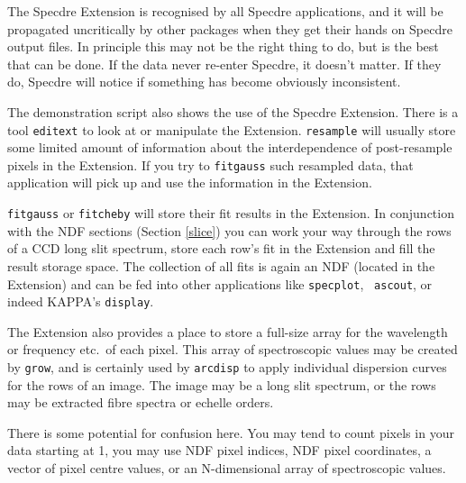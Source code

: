 The Specdre Extension is recognised by all Specdre applications, and it
will be propagated uncritically by other packages when they get their
hands on Specdre output files. In principle this may not be the right
thing to do, but is the best that can be done. If the data never
re-enter Specdre, it doesn't matter. If they do, Specdre will notice if
something has become obviously inconsistent.

The demonstration script also shows the use of the Specdre Extension. There is
a tool {\tt editext} to look at or manipulate the Extension. {\tt resample}
will usually store some limited amount of information about the interdependence
of post-resample pixels in the Extension. If you try to {\tt fitgauss} such
resampled data, that application will pick up and use the information in the
Extension.

{\tt fitgauss} or {\tt fitcheby} will store their fit results in the
Extension. In conjunction with the NDF sections (Section \ref{slice})
you can work your way through the rows of a CCD long slit spectrum,
store each row's fit in the Extension and fill the result storage space.
The collection of all fits is again an NDF (located in the Extension)
and can be fed into other applications like {\tt specplot}, {\tt
ascout}, or indeed KAPPA's {\tt display}.

The Extension also provides a place to store a full-size array for the
wavelength or frequency etc.\ of each pixel.  This array of
spectroscopic values may be created by {\tt grow}, and is certainly used
by {\tt arcdisp} to apply individual dispersion curves for the rows of
an image.  The image may be a long slit spectrum, or the rows may be
extracted fibre spectra or echelle orders.

There is some potential for confusion here.  You may tend to count
pixels in your data starting at 1, you may use NDF pixel indices, NDF
pixel coordinates, a vector of pixel centre values, or an N-dimensional
array of spectroscopic values.

